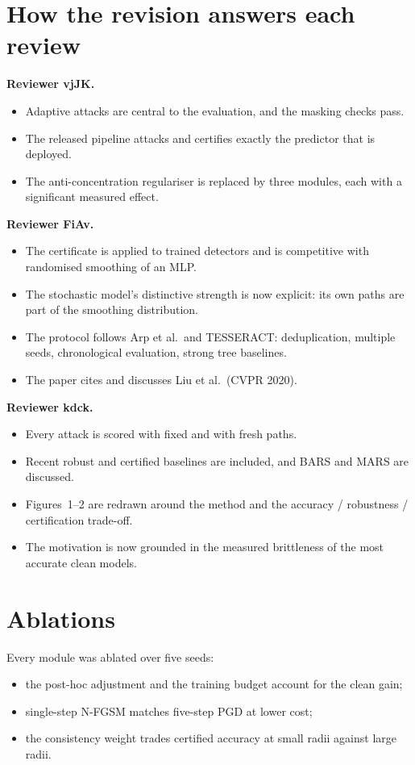 \documentclass[11pt]{article}
\begin{document}
\section*{How the revision answers each review}
\textbf{Reviewer vjJK.}
\begin{itemize}
\item Adaptive attacks are central to the evaluation, and the masking checks pass.
\item The released pipeline attacks and certifies exactly the predictor that is
deployed.
\item The anti-concentration regulariser is replaced by three modules, each with
a significant measured effect.
\end{itemize}
\textbf{Reviewer FiAv.}
\begin{itemize}
\item The certificate is applied to trained detectors and is competitive with
randomised smoothing of an MLP.
\item The stochastic model's distinctive strength is now explicit: its own paths
are part of the smoothing distribution.
\item The protocol follows Arp et al.\ and TESSERACT: deduplication, multiple
seeds, chronological evaluation, strong tree baselines.
\item The paper cites and discusses Liu et al.\ (CVPR 2020).
\end{itemize}
\textbf{Reviewer kdck.}
\begin{itemize}
\item Every attack is scored with fixed and with fresh paths.
\item Recent robust and certified baselines are included, and BARS and MARS are
discussed.
\item Figures~1--2 are redrawn around the method and the accuracy / robustness /
certification trade-off.
\item The motivation is now grounded in the measured brittleness of the most
accurate clean models.
\end{itemize}

\section*{Ablations}
Every module was ablated over five seeds:
\begin{itemize}
\item the post-hoc adjustment and the training budget account for the clean gain;
\item single-step N-FGSM matches five-step PGD at lower cost;
\item the consistency weight trades certified accuracy at small radii against
large radii.
\end{itemize}
\end{document}
